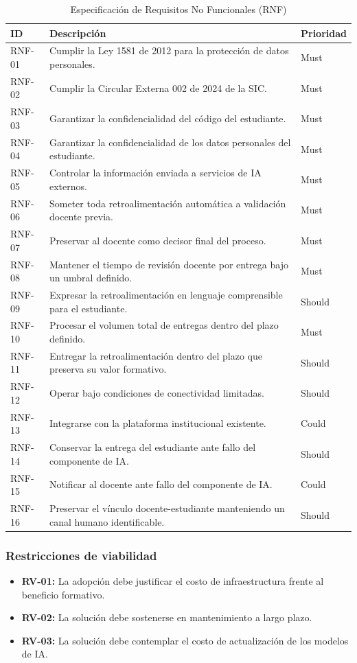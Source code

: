\documentclass[letterpaper, 10 pt, conference]{ieeeconf}
\begin{document}
\begin{table}[ht]
	\centering
	\caption{Especificación de Requisitos No Funcionales (RNF)}
	\label{tab:req_nofuncional}
	\begin{tabular}{lp{5.0cm}l}
		\hline
		\textbf{ID} & \textbf{Descripción} & \textbf{Prioridad} \\
		\hline
		RNF-01 & Cumplir la Ley 1581 de 2012 para la protección de datos personales. & Must \\
		RNF-02 & Cumplir la Circular Externa 002 de 2024 de la SIC. & Must \\
		RNF-03 & Garantizar la confidencialidad del código del estudiante. & Must \\
		RNF-04 & Garantizar la confidencialidad de los datos personales del estudiante. & Must \\
		RNF-05 & Controlar la información enviada a servicios de IA externos. & Must \\
		RNF-06 & Someter toda retroalimentación automática a validación docente previa. & Must \\
		RNF-07 & Preservar al docente como decisor final del proceso. & Must \\
		RNF-08 & Mantener el tiempo de revisión docente por entrega bajo un umbral definido. & Must \\
		RNF-09 & Expresar la retroalimentación en lenguaje comprensible para el estudiante. & Should \\
		RNF-10 & Procesar el volumen total de entregas dentro del plazo definido. & Must \\
		RNF-11 & Entregar la retroalimentación dentro del plazo que preserva su valor formativo. & Should \\
		RNF-12 & Operar bajo condiciones de conectividad limitadas. & Should \\
		RNF-13 & Integrarse con la plataforma institucional existente. & Could \\
		RNF-14 & Conservar la entrega del estudiante ante fallo del componente de IA. & Should \\
		RNF-15 & Notificar al docente ante fallo del componente de IA. & Could \\
		RNF-16 & Preservar el vínculo docente-estudiante manteniendo un canal humano identificable. & Should \\
		\hline
	\end{tabular}
\end{table}

\subsubsection{Restricciones de viabilidad}
\begin{itemize}
	\item \textbf{RV-01:} La adopción debe justificar el costo de infraestructura frente al beneficio formativo.
	\item \textbf{RV-02:} La solución debe sostenerse en mantenimiento a largo plazo.
	\item \textbf{RV-03:} La solución debe contemplar el costo de actualización de los modelos de IA.
\end{itemize}
\end{document}
